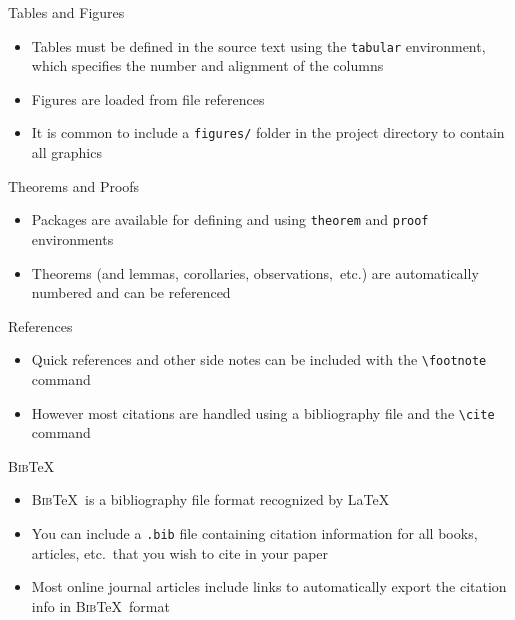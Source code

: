 \documentclass{beamer} %
\begin{document}
\begin{frame}{Tables and Figures}

\begin{itemize}
	\item Tables must be defined in the source text using the \texttt{tabular} environment, which specifies the number and alignment of the columns
	\item Figures are loaded from file references
	\item It is common to include a \texttt{figures/} folder in the project directory to contain all graphics
\end{itemize}

\end{frame}

\begin{frame}{Theorems and Proofs}

\begin{itemize}
	\item Packages are available for defining and using \texttt{theorem} and \texttt{proof} environments
	\item Theorems (and lemmas, corollaries, observations,~etc.) are automatically numbered and can be referenced
\end{itemize}

\end{frame}

\begin{frame}{References}

\begin{itemize}
	\item Quick references and other side notes can be included with the {\tt \textbackslash footnote} command
	\item However most citations are handled using a bibliography file and the {\tt \textbackslash cite} command
\end{itemize}

\end{frame}

\begin{frame}{\textsc{Bib}\TeX}

\begin{itemize}
	\item \textsc{Bib}\TeX\ is a bibliography file format recognized by \LaTeX
	\item You can include a \texttt{.bib} file containing citation information for all books, articles, etc.~that you wish to cite in your paper
	\item Most online journal articles include links to automatically export the citation info in \textsc{Bib}\TeX\ format
\end{itemize}

\end{frame}
\end{document}
